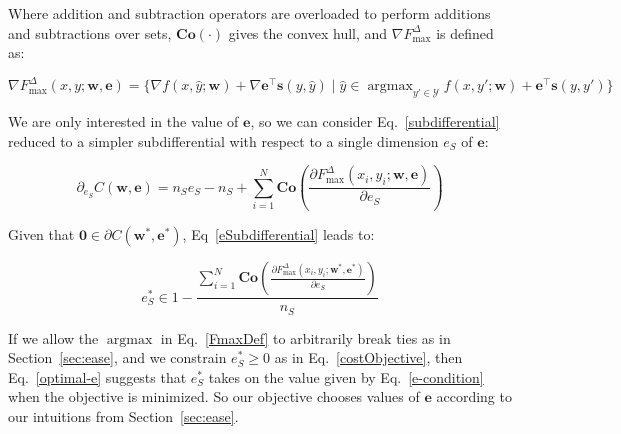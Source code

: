 \documentclass{article} %
\DeclareMathOperator*{\argmax}{argmax}
\newcommand{\bmcomment}[1]{\textcolor{blue}{\textsc{\textbf{[#1 --bm]}}}}
\newcommand{\nascomment}[1]{\textcolor{red}{\textsc{\textbf{[#1 --nas]}}}}
\begin{document}
Where addition and subtraction operators are overloaded to perform 
additions and subtractions over sets, 
$\mathbf{Co}(\cdot)$ gives the convex hull, and 
$\nabla F^{\Delta}_{\max}$ is defined as:

\begin{equation}
\label{FmaxDef}
\nabla F^{\Delta}_{\max}(x,y;\mathbf{w},\mathbf{e}) = 
\{ \nabla f(x, \hat{y} ; \mathbf{w}) +
\nabla \mathbf{e}^\top \mathbf{s}(y, \hat{y})
\mid \hat{y}\in\argmax_{y' \in \mathcal{Y}} f(x, y' ; \mathbf{w}) +
\mathbf{e}^\top \mathbf{s}(y, y') \}
\end{equation}

We are only interested in the value of $\mathbf{e}$, so
we can consider Eq.~\ref{subdifferential} reduced to 
a simpler subdifferential 
with respect to a single dimension $e_S$ of $\mathbf{e}$:

\begin{equation}
\label{eSubdifferential}
\partial_{e_S} C(\mathbf{w},\mathbf{e}) = 
n_S e_S -n_S+
\sum_{i=1}^N 
\mathbf{Co}\left(\frac{\partial 
F^{\Delta}_{\max}(x_i,y_i;\mathbf{w},\mathbf{e})}{\partial e_S}\right)
\end{equation}

Given that $\mathbf{0}\in \partial C(\mathbf{w}^*,\mathbf{e}^*)$,
Eq~\ref{eSubdifferential} leads to:

\begin{equation}
\label{optimal-e}
e_S^*\in 1 - \frac{\sum_{i=1}^N 
\mathbf{Co}(\frac{\partial 
F^{\Delta}_{\max}(x_i,y_i;\mathbf{w}^*,\mathbf{e}^*)}{\partial e_S})}{n_S}
\end{equation}

If we allow the $\argmax$ in Eq.~\ref{FmaxDef} to arbitrarily break
ties as in Section~\ref{sec:ease}, and we constrain $e^*_S\geq 0$ as in
Eq.~\ref{costObjective}, then Eq.~\ref{optimal-e} suggests that 
$e^*_S$ takes on the value given by Eq.~\ref{e-condition} when the
objective is minimized.  So our objective chooses values of 
$\mathbf{e}$ according to our intuitions from Section~\ref{sec:ease}.


\end{document}
